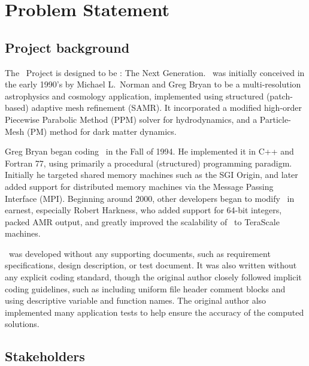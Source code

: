 \documentclass{article}
\begin{document}

\section{Problem Statement}
\subsection{Project background}


    The \cello\ Project is designed to be \enzo: The Next Generation.
    \enzo\ was initially conceived in the early 1990's by Michael
    L.~Norman and Greg Bryan to be a multi-resolution astrophysics and
    cosmology application, implemented using structured (patch-based)
    adaptive mesh refinement (SAMR).  It incorporated a modified
    high-order Piecewise Parabolic Method (PPM) solver for
    hydrodynamics, and a Particle-Mesh (PM) method for dark matter
    dynamics.

    Greg Bryan began coding \enzo\ in the Fall of 1994.  He
    implemented it in C++ and Fortran 77, using primarily a procedural
    (structured) programming paradigm.  Initially he targeted shared
    memory machines such as the SGI Origin, and later added support
    for distributed memory machines via the Message Passing Interface
    (MPI).  Beginning around 2000, other developers began to modify
    \enzo\ in earnest, especially Robert Harkness, who added support
    for 64-bit integers, packed AMR output, and greatly improved
    the scalability of \enzo\ to TeraScale machines.

    \enzo\ was developed without any supporting documents, such as
    requirement specifications, design description, or test document.
    It was also written without any explicit coding standard, though
    the original author closely followed implicit coding guidelines,
    such as including uniform file header comment blocks and using
    descriptive variable and function names.  The original author also
    implemented many application tests to help ensure the accuracy
    of the computed solutions.

\subsection{Stakeholders}
\end{document}
